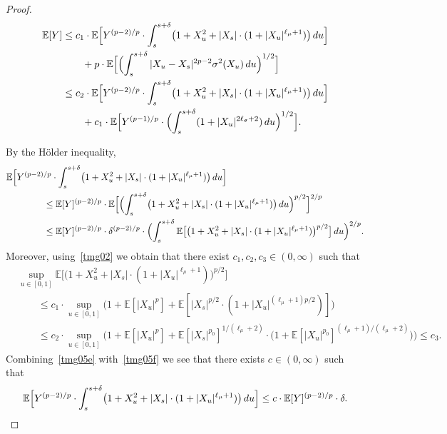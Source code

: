 \documentclass[11pt]{amsart}
\newcommand{\EE}{{\mathbb E}}
\theoremstyle{plain}
\theoremstyle{definition}
\begin{document}
\begin{proof}
\begin{equation}\label{tmg05d}
\begin{aligned}
\EE[Y] & \le c_1\cdot  \EE\Bigl[Y^{(p-2)/p}\cdot \int_s^{s+\delta}  \bigl( 1+X_u^2 + |X_s|\cdot (1 + |X_u|^{\ell_\mu+1})\bigr)\, du\Bigr]\\& \qquad + p\cdot \EE\Bigl[\Bigl(\int_s^{s+\delta} |X_u-X_s|^{2p-2}\sigma^2(X_u)\, du\Bigr)^{1/2}\Bigr]\\
& \le c_2\cdot \EE\Bigl[Y^{(p-2)/p}\cdot \int_s^{s+\delta}  \bigl( 1+X_u^2 + |X_s|\cdot (1 + |X_u|^{\ell_\mu+1})\bigr)\, du\Bigr] \\
&  \qquad + c_1\cdot \EE\Bigl[Y^{(p-1)/p}\cdot\Bigl(\int_s^{s+\delta} (1+|X_u|^{2\ell_\sigma+2})\, du\Bigr)^{1/2}\Bigr].
\end{aligned}
\end{equation}

By the H\"older inequality,
\begin{equation}\label{tmg05e}
\begin{aligned}
 & \EE\Bigl[Y^{(p-2)/p}\cdot \int_s^{s+\delta}  \bigl( 1+X_u^2 + |X_s|\cdot (1 + |X_u|^{\ell_\mu+1})\bigr)\, du\Bigr]\\
 & \qquad\qquad \le \EE[Y]^{(p-2)/p} \cdot\EE\Bigl[\Bigl(\int_s^{s+\delta}  \bigl( 1+X_u^2 + |X_s|\cdot (1 + |X_u|^{\ell_\mu+1})\bigr)\, du\Bigr)^{p/2}\Bigr]^{2/p} \\
 & \qquad\qquad \le  \EE[Y]^{(p-2)/p} \cdot\delta^{(p-2)/p} \cdot\Bigl( \int_s^{s+\delta}  \EE\bigl[\bigl( 1+X_u^2 + |X_s|\cdot(1 + |X_u|^{\ell_\mu+1})\bigr)^{p/2}\bigr]\, du\Bigr)^{2/p}.
\end{aligned}
\end{equation}
Moreover, using~\eqref{tmg02} we obtain that there exist $c_1,c_2,c_3\in (0,\infty)$ such that
\begin{equation}\label{tmg05f}
\begin{aligned}
& \sup_{u\in[0,1]}  \EE\bigl[\bigl( 1+X_u^2 + |X_s|\cdot (1 + |X_u|^{\ell_\mu+1})\bigr)^{p/2}\bigr]\\
& \qquad \le c_1\cdot  \sup_{u\in[0,1]} \bigl(1 + \EE[|X_u|^p] + \EE[|X_s|^{p/2}\cdot (1+|X_u|^{(\ell_\mu+1)p/2})]\bigr)\\
& \qquad \le c_2 \cdot\sup_{u\in[0,1]} \bigl(1 + \EE[|X_u|^p] + \EE[|X_s|^{p_0}]^{1/(\ell_\mu+2)}\cdot\bigl(1+\EE[|X_u|^{p_0}]^{(\ell_\mu+1)/(\ell_\mu+2)}\bigr)\bigr)\leq c_3.
\end{aligned}
\end{equation}
 Combining~\eqref{tmg05e} with~\eqref{tmg05f} we see that there exists $c\in (0,\infty)$ such that
\begin{equation}\label{tmg05g}
 \EE\Bigl[Y^{(p-2)/p}\cdot \int_s^{s+\delta}  \bigl( 1+X_u^2 + |X_s|\cdot (1 + |X_u|^{\ell_\mu+1})\bigr)\, du\Bigr] \le
c \cdot \EE[Y]^{(p-2)/p} \cdot \delta.
\end{equation}


\end{proof}
\end{document}
